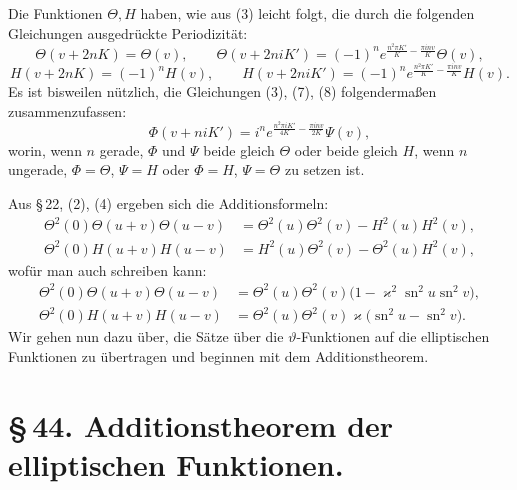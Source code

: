 \documentclass[11pt]{article}
\providecommand{\sn}{\operatorname{sn}}
\begin{document}
Die Funktionen $\Theta,H$ haben, wie aus (3) leicht folgt, die durch die folgenden Gleichungen ausgedrückte Periodizität:
\begin{equation}
\Theta(v+2nK)=\Theta(v),
\qquad
\Theta(v+2niK')=(-1)^n e^{\frac{n^2\pi K'}{K}-\frac{\pi i n v}{K}}\Theta(v),
\tag{7}
\end{equation}
\begin{equation}
H(v+2nK)=(-1)^nH(v),
\qquad
H(v+2niK')=(-1)^n e^{\frac{n^2\pi K'}{K}-\frac{\pi i n v}{K}}H(v).
\tag{8}
\end{equation}
Es ist bisweilen nützlich, die Gleichungen (3), (7), (8) folgendermaßen zusammenzufassen:
\begin{equation}
\Phi(v+niK')=i^n e^{\frac{n^2\pi iK'}{4K}-\frac{\pi inv}{2K}}\Psi(v),
\tag{9}
\end{equation}
worin, wenn $n$ gerade, $\Phi$ und $\Psi$ beide gleich $\Theta$ oder beide gleich $H$, wenn $n$ ungerade, $\Phi=\Theta$, $\Psi=H$ oder $\Phi=H$, $\Psi=\Theta$ zu setzen ist.

Aus \S\,22, (2), (4) ergeben sich die Additionsformeln:
\begin{equation}
\begin{aligned}
\Theta^2(0)\Theta(u+v)\Theta(u-v)&=\Theta^2(u)\Theta^2(v)-H^2(u)H^2(v),\\
\Theta^2(0)H(u+v)H(u-v)&=H^2(u)\Theta^2(v)-\Theta^2(u)H^2(v),
\end{aligned}
\tag{10}
\end{equation}
wofür man auch schreiben kann:
\begin{equation}
\begin{aligned}
\Theta^2(0)\Theta(u+v)\Theta(u-v)&=\Theta^2(u)\Theta^2(v)\bigl(1-\varkappa^2\sn^2u\sn^2v\bigr),\\
\Theta^2(0)H(u+v)H(u-v)&=\Theta^2(u)\Theta^2(v)\varkappa\bigl(\sn^2u-\sn^2v\bigr).
\end{aligned}
\tag{11}
\end{equation}
Wir gehen nun dazu über, die Sätze über die $\vartheta$-Funktionen auf die elliptischen Funktionen zu übertragen und beginnen mit dem Additionstheorem.

\section*{\S\,44. Additionstheorem der elliptischen Funktionen.}
\end{document}
